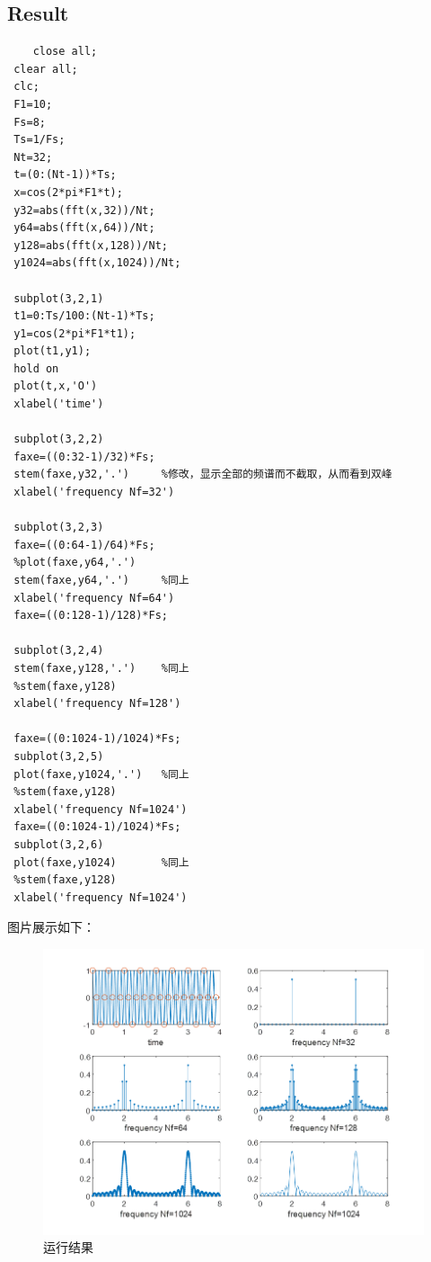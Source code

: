 \documentclass{article}
\begin{document}
\subsection{Result}
\begin{lstlisting}
    close all;
 clear all;
 clc;
 F1=10;
 Fs=8;
 Ts=1/Fs;
 Nt=32;
 t=(0:(Nt-1))*Ts;
 x=cos(2*pi*F1*t);
 y32=abs(fft(x,32))/Nt;
 y64=abs(fft(x,64))/Nt;
 y128=abs(fft(x,128))/Nt;
 y1024=abs(fft(x,1024))/Nt;

 subplot(3,2,1)
 t1=0:Ts/100:(Nt-1)*Ts;
 y1=cos(2*pi*F1*t1);
 plot(t1,y1);
 hold on
 plot(t,x,'O')
 xlabel('time')

 subplot(3,2,2)
 faxe=((0:32-1)/32)*Fs;
 stem(faxe,y32,'.')     %修改，显示全部的频谱而不截取，从而看到双峰
 xlabel('frequency Nf=32')

 subplot(3,2,3)
 faxe=((0:64-1)/64)*Fs;
 %plot(faxe,y64,'.')
 stem(faxe,y64,'.')     %同上
 xlabel('frequency Nf=64')
 faxe=((0:128-1)/128)*Fs;

 subplot(3,2,4)
 stem(faxe,y128,'.')    %同上
 %stem(faxe,y128)
 xlabel('frequency Nf=128')

 faxe=((0:1024-1)/1024)*Fs;
 subplot(3,2,5)
 plot(faxe,y1024,'.')   %同上
 %stem(faxe,y128)
 xlabel('frequency Nf=1024')
 faxe=((0:1024-1)/1024)*Fs;
 subplot(3,2,6)
 plot(faxe,y1024)       %同上
 %stem(faxe,y128)
 xlabel('frequency Nf=1024')
\end{lstlisting}

图片展示如下：
\begin{figure}[H]
    \centering
    \includegraphics[width=1\linewidth]{运行结果.png}
    \caption{运行结果}
    \label{fig:result}
\end{figure}
\end{document}
